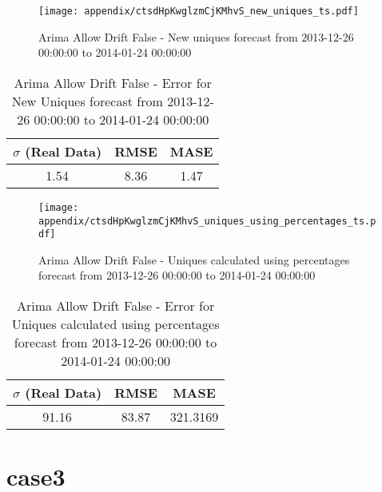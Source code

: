 \begin{figure}[H] \begin{center} \leavevmode
\texttt{[image: appendix/ctsdHpKwglzmCjKMhvS\_new\_uniques\_ts.pdf]} \caption{
Arima Allow Drift False - New uniques forecast from 2013-12-26 00:00:00 to 2014-01-24 00:00:00} \label{fig:appendix/ctsdHpKwglzmCjKMhvS_new_uniques_ts.pdf} \end{center}
\end{figure}

\begin{table}[H]
\centering
\footnotesize
\begin{tabular}{ccc}
$\sigma$ (Real Data) & RMSE & MASE   \\ \hline
1.54 & 8.36 & 1.47 \\
\end{tabular}

\vspace{0.5cm}

\caption{
Arima Allow Drift False - Error for New Uniques forecast from 2013-12-26 00:00:00 to 2014-01-24 00:00:00}
\end{table}

\begin{figure}[H] \begin{center} \leavevmode
\texttt{[image: appendix/ctsdHpKwglzmCjKMhvS\_uniques\_using\_percentages\_ts.pdf]} \caption{
Arima Allow Drift False - Uniques calculated using percentages forecast from 2013-12-26 00:00:00 to 2014-01-24 00:00:00} \label{fig:appendix/ctsdHpKwglzmCjKMhvS_uniques_using_percentages_ts.pdf} \end{center}
\end{figure}

\begin{table}[H]
\centering
\footnotesize
\begin{tabular}{ccc}
$\sigma$ (Real Data) & RMSE & MASE   \\ \hline
91.16 & 83.87 & 321.3169 \\
\end{tabular}

\vspace{0.5cm}

\caption{
Arima Allow Drift False - Error for Uniques calculated using percentages forecast from 2013-12-26 00:00:00 to 2014-01-24 00:00:00}
\end{table}

\chapter{case3}


